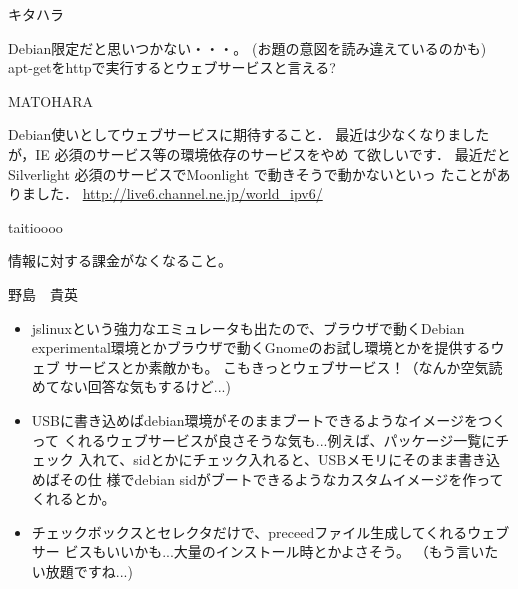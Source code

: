 


\begin{prework}{ キタハラ }

Debian限定だと思いつかない・・・。
(お題の意図を読み違えているのかも)
apt-getをhttpで実行するとウェブサービスと言える?
\end{prework}

\begin{prework}{ MATOHARA }

Debian使いとしてウェブサービスに期待すること．
最近は少なくなりましたが，IE 必須のサービス等の環境依存のサービスをやめ
 て欲しいです．
最近だとSilverlight 必須のサービスでMoonlight で動きそうで動かないといっ
 たことがありました．
\url{http://live6.channel.ne.jp/world_ipv6/}
\end{prework}

\begin{prework}{ taitioooo }

情報に対する課金がなくなること。

\end{prework}

\begin{prework}{ 野島　貴英 }

\begin{itemize}
\item jslinuxという強力なエミュレータも出たので、ブラウザで動くDebian
 experimental環境とかブラウザで動くGnomeのお試し環境とかを提供するウェブ
 サービスとか素敵かも。
こもきっとウェブサービス！（なんか空気読めてない回答な気もするけど...)

\item USBに書き込めばdebian環境がそのままブートできるようなイメージをつくって
 くれるウェブサービスが良さそうな気も...例えば、パッケージ一覧にチェック
 入れて、sidとかにチェック入れると、USBメモリにそのまま書き込めばその仕
 様でdebian sidがブートできるようなカスタムイメージを作ってくれるとか。

\item チェックボックスとセレクタだけで、preceedファイル生成してくれるウェブサー
 ビスもいいかも...大量のインストール時とかよさそう。
（もう言いたい放題ですね...)
\end{itemize}











\end{prework}

